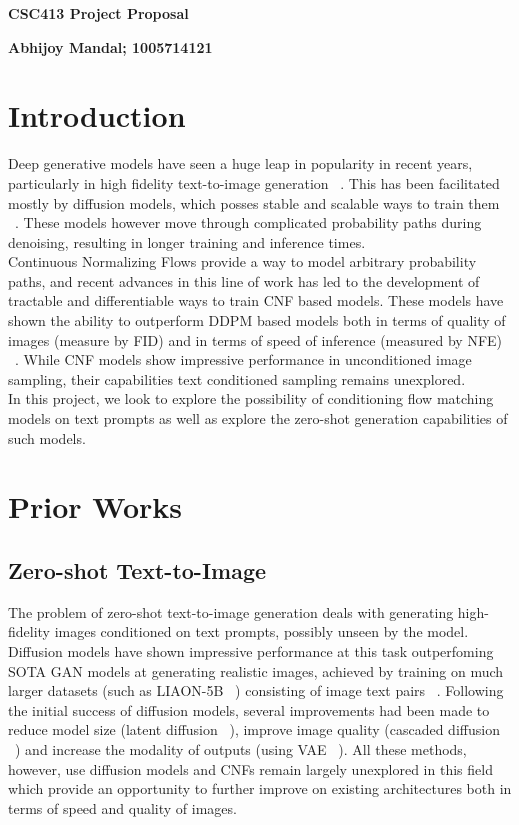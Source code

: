 \documentclass[12pt]{article}
\begin{document}
\color{black}
\begin{center}\textbf{\large CSC413 Project Proposal}\\\bigskip

 {\bf Abhijoy Mandal; 1005714121
  }
\end{center}

\noindent

\section{Introduction}

Deep generative models have seen a huge leap in popularity in recent years, particularly in high fidelity text-to-image generation ~\cite{ramesh2021zeroshot}. This has been facilitated mostly by diffusion models, which posses stable and scalable ways to train them ~\cite{NEURIPS2020_4c5bcfec}. These models however move through complicated probability paths during denoising, resulting in longer training and inference times. ~\cite{lipman2023flow}
\\
Continuous Normalizing Flows provide a way to model arbitrary probability paths, and recent advances in this line of work has led to the development of tractable and differentiable ways to train CNF based models. These models have shown the ability to outperform DDPM based models both in terms of quality of images (measure by FID) and in terms of speed of inference (measured by NFE) ~\cite{lipman2023flow}. While CNF models show impressive performance in unconditioned image sampling, their capabilities text conditioned sampling remains unexplored.
\\
In this project, we look to explore the possibility of conditioning flow matching models on text prompts as well as explore the zero-shot generation capabilities of such models.

\section{Prior Works}
\subsection{Zero-shot Text-to-Image}
The problem of zero-shot text-to-image generation deals with generating high-fidelity images conditioned on text prompts, possibly unseen by the model. Diffusion models have shown impressive performance at this task outperfoming SOTA GAN models at generating realistic images, achieved by training on much larger datasets (such as LIAON-5B ~\cite{schuhmann2022laion}) consisting of image text pairs ~\cite{ramesh2021zeroshot, saharia2022photorealistic}. Following the initial success of diffusion models, several improvements had been made to reduce model size (latent diffusion ~\cite{rombach2022high}), improve image quality (cascaded diffusion ~\cite{ho2022cascaded}) and increase the modality of outputs (using VAE ~\cite{ramesh2021zeroshot}). All these methods, however, use diffusion models and CNFs remain largely unexplored in this field which provide an opportunity to further improve on existing architectures both in terms of speed and quality of images.
\end{document}

